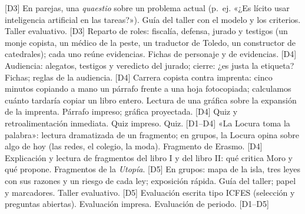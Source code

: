 \documentclass[parcelacion]{planeacion}
\begin{document}
\begin{parcelacion}
    { {\scriptsize[D3]}}
    {En parejas, una \emph{quaestio} sobre un problema actual (p.~ej. «¿Es lícito usar
     inteligencia artificial en las tareas?»).}
    {Guía del taller con el modelo y los criterios.}
    {Taller evaluativo. {\scriptsize[D3]}}
    {Reparto de roles: fiscalía, defensa, jurado y testigos (un monje copista, un médico de la
     peste, un traductor de Toledo, un constructor de catedrales); cada uno reúne evidencias.}
    {Fichas de personaje y de evidencias.}
    { {\scriptsize[D4]}}
    {Audiencia: alegatos, testigos y veredicto del jurado; cierre: ¿es justa la etiqueta?}
    {Fichas; reglas de la audiencia.}
    { {\scriptsize[D4]}}
    {Carrera copista contra imprenta: cinco minutos copiando a mano un párrafo frente a una hoja
     fotocopiada; calculamos cuánto tardaría copiar un libro entero. Lectura de una gráfica sobre
     la expansión de la imprenta.}
    {Párrafo impreso; gráfica proyectada.}
    { {\scriptsize[D4]}}
    {Quiz y retroalimentación inmediata.}
    {Quiz impreso.}
    {Quiz. {\scriptsize[D1--D4]}}
    {«La Locura toma la palabra»: lectura dramatizada de un fragmento; en grupos, la Locura opina
     sobre algo de hoy (las redes, el colegio, la moda).}
    {Fragmento de Erasmo.}
    { {\scriptsize[D4]}}
    {Explicación y lectura de fragmentos del libro I y del libro II: qué critica Moro y qué
     propone.}
    {Fragmentos de la \emph{Utopía}.}
    { {\scriptsize[D5]}}
    {En grupos: mapa de la isla, tres leyes con sus razones y un riesgo de cada ley; exposición
     rápida.}
    {Guía del taller; papel y marcadores.}
    {Taller evaluativo. {\scriptsize[D5]}}
    {Evaluación escrita tipo ICFES (selección y preguntas abiertas).}
    {Evaluación impresa.}
    {Evaluación de periodo. {\scriptsize[D1--D5]}}
\end{parcelacion}
\end{document}
